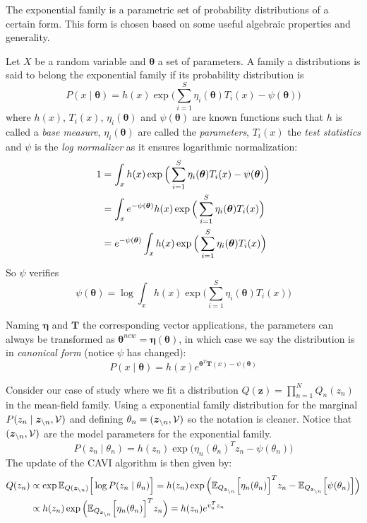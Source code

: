 
The exponential family is a parametric set of probability distributions of a certain form. This form is chosen based on some useful algebraic properties and generality.

Let \(X\) be a random variable and \(\bm{\theta}\) a set of parameters. A family a distributions is said to belong the exponential family if its probability distribution is
\[
  P(x \mid \bm{\theta}) = h(x)\exp{\Big( \sum_{i=1}^{S} \eta_{i}(\bm{\theta})T_{i}(x) - \psi(\bm{\theta}) \Big)}
\]
where \(h(x)\), \(T_{i}(x)\), \(\eta_{i}(\bm{\theta})\) and \(\psi(\bm{\theta})\)  are known functions such that \(h\) is called a \emph{base measure}, \(\eta_{i}(\bm{\theta})\) are called the \emph{parameters},  \(T_{i}(x)\) the \emph{test statistics} and \(\psi\) is the \emph{log normalizer} as it ensures logarithmic normalization:
\[
  \begin{aligned}
    1 &= \int_{x}  h(x)\exp{\Big( \sum_{i=1}^{S} \eta_{i}(\bm{\theta})T_{i}(x) - \psi(\bm{\theta}) \Big)}\\
    &= \int_{x} e^{-\psi(\bm{\theta})} h(x)\exp{\Big( \sum_{i=1}^{S} \eta_{i}(\bm{\theta})T_{i}(x) \Big)}\\
    &= e^{-\psi(\bm{\theta})} \int_{x} h(x)\exp{\Big( \sum_{i=1}^{S} \eta_{i}(\bm{\theta})T_{i}(x) \Big)}
  \end{aligned}
\]
So \(\psi\) verifies
\[
      \psi(\bm{\theta}) = \log \int_{x} h(x) \exp \Big( \sum_{i=1}^{S} \eta_{i}(\bm{\theta})T_{i}(x) \Big)
\]

Naming \(\bm{\eta}\) and \(\bm{T}\) the corresponding vector applications, the parameters can always be transformed as \(\bm{\theta}^{new} = \bm{\eta}(\bm{\theta})\), in which case we say the distribution is in \emph{canonical form} (notice \(\psi\) has changed):
\[
  P(x \mid \bm{\theta}) = h(x) e^{\bm{\theta}^{T}\bm{T}(x) - \psi(\bm{\theta})}
\]

Consider our case of study where we fit a distribution \(Q(\bm{z}) = \prod_{n=1}^{N} Q_{n}(z_{n})\) in the mean-field family. Using a exponential family distribution for the marginal \(P(z_{n} \mid \bm{z}_{\backslash n}, \mathcal{V})\) and defining \( \theta_{n} = (\bm{z}_{\backslash n}, \mathcal{V})\) so the notation is cleaner. Notice that \( (\bm{z}_{\backslash n}, \mathcal{V}) \) are the model parameters for the exponential family.
\[
  P(z_{n} \mid \theta_{n}) = h(z_{n})\exp \Big( {\eta_{n}(\theta_{n})}^{T}z_{n} - \psi(\theta_{n}) \Big)
\]
The update of the CAVI algorithm  is then given by:
  \begin{align}
    Q(z_{n}) &\propto \exp{\mathbb{E}_{Q(\bm{z}_{\backslash n})}\Big[\log P(z_{n} \mid \theta_{n})\Big]} = h(z_{n})\exp \Big(\mathbb{E}_{Q_{\bm{z}_{\backslash n}}}\Big[ {\eta_{n}(\theta_{n})}\Big]^{T}z_{n} - \mathbb{E}_{Q_{\bm{z}_{\backslash n}}}\Big[ \psi(\theta_{n})\Big]\Big) \nonumber \\
    &\propto  h(z_{n})\exp \Big(\mathbb{E}_{Q_{\bm{z}_{\backslash n}}}\Big[ {\eta_{n}(\theta_{n})}\Big]^{T}z_{n}\Big) = h(z_{n})e^{v_{n}^{T}z_{n} } \label{eq:exponential_update}
  \end{align}

